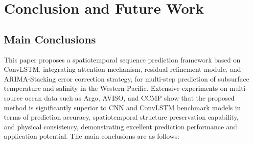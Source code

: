 \documentclass[webpdf,contemporary,large]{oup-authoring-template}
\begin{document}
\begin{table}[htbp]
\vspace{1em}

\caption{Ablation Study Results: MAE and Improvement Percentage}
\label{tab:ablation_mae}
\end{table}

\section{Conclusion and Future Work}

\subsection{Main Conclusions}

This paper proposes a spatiotemporal sequence prediction framework based on ConvLSTM, integrating attention mechanism, residual refinement module, and ARIMA-Stacking error correction strategy, for multi-step prediction of subsurface temperature and salinity in the Western Pacific. Extensive experiments on multi-source ocean data such as Argo, AVISO, and CCMP show that the proposed method is significantly superior to CNN and ConvLSTM benchmark models in terms of prediction accuracy, spatiotemporal structure preservation capability, and physical consistency, demonstrating excellent prediction performance and application potential. The main conclusions are as follows:
\end{document}
